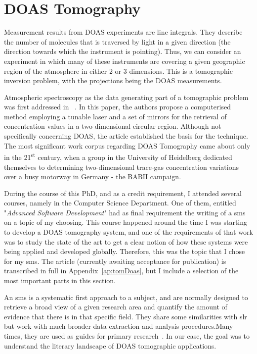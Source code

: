 

\section{DOAS Tomography}%
\label{sec:doas_tomography}

Measurement results from \gls{DOAS} experiments are line integrals. They
describe the number of molecules that is traversed by light in a given
direction (the direction towards which the instrument is pointing).
Thus, we can consider an experiment in which many of these instruments
are covering a given geographic region of the atmosphere in either 2 or
3 dimensions. This is a tomographic inversion problem, with the
projections being the \gls{DOAS} measurements.





Atmospheric spectroscopy as the data generating part of a tomographic
problem was first addressed in ~. In this
paper, the authors propose a computerised method employing a tunable
laser  and a set of mirrors for the retrieval of concentration values in
a two-dimensional circular region. Although not specifically concerning
\gls{DOAS}, the article established the basis for the technique.  The
most significant work corpus regarding DOAS Tomography came about only
in the 21\textsuperscript{st} century, when a group in the University of
Heidelberg dedicated themselves to determining two-dimensional trace-gas
concentration variations over a busy motorway in Germany - the BABII
campaign. 



During the course of this PhD, and as a credit requirement, I attended
several courses, namely in the Computer Science Department. One of them,
entitled "\emph{Advanced Software Development}" had as final requirement
the writing of a \gls{sms} on a topic of my choosing. This course
happened around the time I was starting to develop a \gls{DOAS}
tomography system, and one of the requirements of that work was to study
the state of the art to get a clear notion of how these systems were
being applied and developed globally. Therefore, this was the topic that
I chose for my \gls{sms}. The article (currently awaiting acceptance for
publication) is transcribed in full in Appendix~\ref{ap:tomDoas},  but I
include a selection of the most important parts in this section.

An \gls{sms} is a systematic first approach to a subject, and are
normally designed to retrieve a broad view of a given research area and
quantify the amount of evidence that there is in that specific field.
They share some similarities with \gls{slr} but work with much broader
data extraction and analysis procedures.Many times, they are used as
guides for primary research~\cite{Kitchenham2007}. In our case, the goal
was to understand the literary landscape of \gls{DOAS} tomographic
applications.

